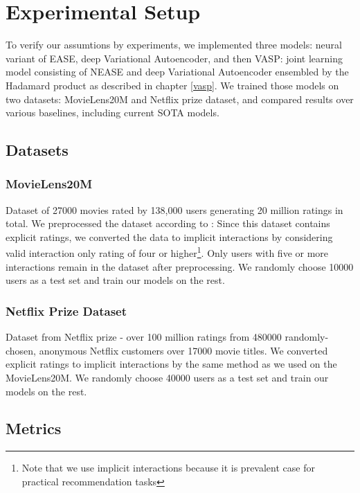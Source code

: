 \documentclass[conference]{IEEEtran}
\begin{document}
\section{Experimental Setup}\label{expsetup}
  
    To verify our assumtions by experiments, we implemented three models: neural variant of EASE, deep Variational Autoencoder, and then VASP: joint learning model consisting of NEASE and deep Variational Autoencoder ensembled by the Hadamard product as described in chapter \ref{vasp}. We trained those models on two datasets: MovieLens20M and Netflix prize dataset, and compared results over various baselines, including current SOTA models.
    
    \subsection{Datasets} 
        


        \subsubsection{MovieLens20M \cite{movieLens}} Dataset of 27000 movies rated by 138,000 users generating 20 million ratings in total. We preprocessed the dataset according to \cite{Liang2018}: Since this dataset contains explicit ratings, we converted the data to implicit interactions by considering valid interaction only rating of four or higher\footnote{Note that we use implicit interactions because it is prevalent case for practical recommendation tasks}. Only users with five or more interactions remain in the dataset after preprocessing. We randomly choose 10000 users as a test set and train our models on the rest.
        
        \subsubsection{Netflix Prize Dataset \cite{Bennett2007}} Dataset from Netflix prize - over 100 million ratings from 480000 randomly-chosen, anonymous Netflix customers over 17000 movie titles. We converted explicit ratings to implicit interactions by the same method as we used on the MovieLens20M. We randomly choose 40000 users as a test set and train our models on the rest.
        


    \subsection{Metrics}
        
\end{document}

